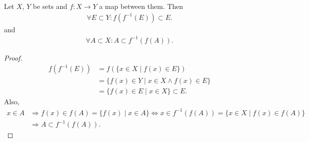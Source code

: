 \begin{theorem}
	Let $X$, $Y$ be sets and $f: X\to Y$ a map between them. Then 
	\begin{align}\label{eq:image_preimage_of_set}
		\forall E\subset Y: f(f^{-1}(E))\subset E.
	\end{align}
	and 
	\begin{align}\label{eq:preimage_image_of_set}
		\forall A\subset X: A\subset f^{-1}(f(A)).
	\end{align}
\end{theorem}

\begin{proof}
	\begin{align*}
		f(f^{-1}(E)) &= f(\{x\in X\mid f(x)\in E\}) \\ &= \{f(x)\in Y\mid x\in X\wedge f(x)\in E\} \\ &= \{ f(x)\in E\mid x\in X \}\subset E.
	\end{align*}
	Also, 
	\begin{align*}
		x\in A&\Rightarrow f(x)\in f(A) = \{f(x)\mid x\in A\}\Leftrightarrow x\in f^{-1}(f(A)) = \{x\in X\mid f(x)\in f(A)\}
		\\ &\Rightarrow A\subset f^{-1}(f(A)).
	\end{align*}
	
\end{proof}